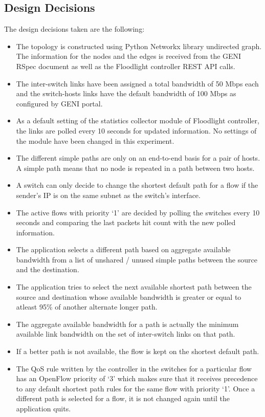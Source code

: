 \documentclass[paper=a4, fontsize=12pt]{scrartcl}	%
\numberwithin{equation}{section}		%
\numberwithin{figure}{section}			%
\numberwithin{table}{section}				%
\begin{document}
\subsection{Design Decisions}
The design decisions taken are the following:
\begin{itemize}
\item The topology is constructed using Python Networkx library undirected graph. The information for the nodes and the edges is received from the GENI RSpec document as well as the Floodlight controller REST API calls.
\item The inter-switch links have been assigned a total bandwidth of 50 Mbps each and the switch-hosts links have the default bandwidth of 100 Mbps as configured by GENI portal.
\item As a default setting of the statistics collector module of Floodlight controller, the links are polled every 10 seconds for updated information. No settings of the module have been changed in this experiment.
\item The different simple paths are only on an end-to-end basis for a pair of hosts. A simple path means that no node is repeated in a path between two hosts.
\item A switch can only decide to change the shortest default path for a flow if the sender's IP is on the same subnet as the switch's interface.
\item The active flows with priority `1' are decided by polling the switches every 10 seconds and comparing the last packets hit count with the new polled information.
\item The application selects a different path based on aggregate available bandwidth from a list of unshared / unused simple paths between the source and the destination.
\item The application tries to select the next available shortest path between the source and destination whose available bandwidth is greater or equal to atleast 95\% of another alternate longer path.
\item The aggregate available bandwidth for a path is actually the minimum available link bandwidth on the set of inter-switch links on that path.
\item If a better path is not available, the flow is kept on the shortest default path.
\item The QoS rule written by the controller in the switches for a particular flow has an OpenFlow priority of `3' which makes sure that it receives precedence to any default shortest path rules for the same flow with priority `1'. Once a different path is selected for a flow, it is not changed again until the application quits.

\end{itemize}
\end{document}
